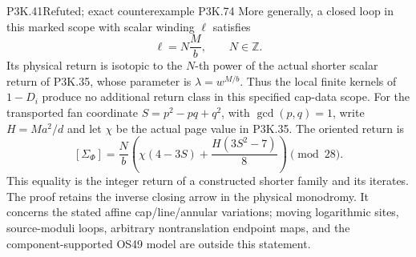 \begin{statement}{P3K.41}{Refuted; exact counterexample P3K.74}
More generally, a closed loop in this marked scope with scalar
winding \(\ell\) satisfies
\[
                       \ell=N\frac{M}{b},\qquad N\in\mathbb Z.
\]
Its physical return is isotopic to the \(N\)-th power of the
actual shorter scalar return of P3K.35, whose parameter is
\(\lambda=w^{M/b}\). Thus the local finite kernels of \(1-D_i\)
produce no additional return class in this specified cap-data scope.
For the transported fan coordinate \(S=p^2-pq+q^2\), with
\(\gcd(p,q)=1\), write \(H=Ma^2/d\) and let \(\chi\) be the
actual page value in P3K.35. The oriented return is
\[
 [\Sigma_\Phi]
 =\frac{N}{b}\left(\chi(4-3S)+\frac{H(3S^2-7)}8\right)
                         \pmod{28}.
\]
This equality is the integer return of a constructed shorter family
and its iterates. The proof retains the inverse closing arrow in the
physical monodromy. It concerns the stated affine cap/line/annular
variations; moving logarithmic sites, source-moduli loops, arbitrary
nontranslation endpoint maps, and the component-supported OS49
model are outside this statement.

\end{statement}

